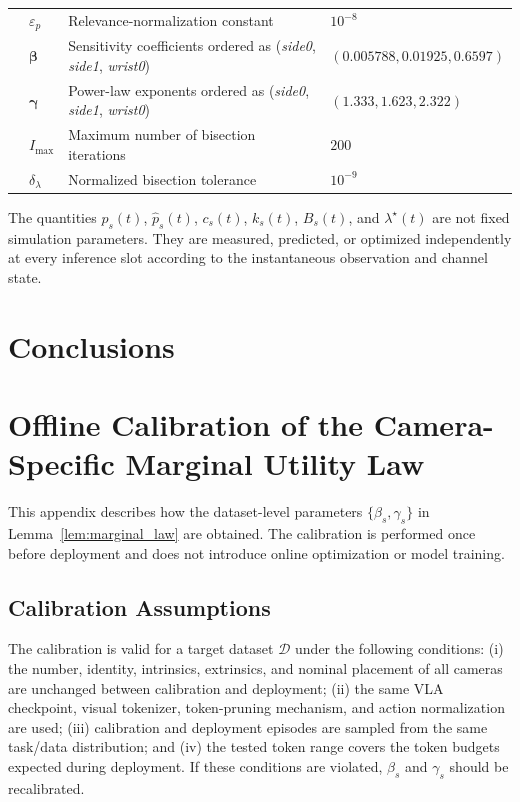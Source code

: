 \documentclass[lettersize,journal]{IEEEtran}
\theoremstyle{custom}
\begin{document}
\begin{table}[t]
\begin{tabular}{
    p{}
    p{}
    p{}
    p{}}
& $\varepsilon_p$
& Relevance-normalization constant
& $10^{-8}$ \\

& $\boldsymbol{\beta}$
& Sensitivity coefficients ordered as
(\emph{side0}, \emph{side1}, \emph{wrist0})
& $(0.005788,0.01925,0.6597)$ \\

& $\boldsymbol{\gamma}$
& Power-law exponents ordered as
(\emph{side0}, \emph{side1}, \emph{wrist0})
& $(1.333,1.623,2.322)$ \\

& $I_{\max}$
& Maximum number of bisection iterations
& $200$ \\

& $\delta_{\lambda}$
& Normalized bisection tolerance
& $10^{-9}$ \\

\bottomrule
\end{tabular}
\end{table}

The quantities $p_s(t)$, $\widehat p_s(t)$, $c_s(t)$, $k_s(t)$,
$B_s(t)$, and $\lambda^\star(t)$ are not fixed simulation parameters.
They are measured, predicted, or optimized independently at every
inference slot according to the instantaneous observation and channel
state.
 
\section{Conclusions}

\appendices
\section{Offline Calibration of the Camera-Specific Marginal Utility Law}\label{app:calibration}
This appendix describes how the dataset-level parameters $\{\beta_s,\gamma_s\}$ in Lemma~\ref{lem:marginal_law} are obtained. The calibration is performed once before deployment and does not introduce online optimization or model training.

\subsection{Calibration Assumptions}
The calibration is valid for a target dataset $\mathcal D$ under the following conditions: (i) the number, identity, intrinsics, extrinsics, and nominal placement of all cameras are unchanged between calibration and deployment; (ii) the same VLA checkpoint, visual tokenizer, token-pruning mechanism, and action normalization are used; (iii) calibration and deployment episodes are sampled from the same task/data distribution; and (iv) the tested token range covers the token budgets expected during deployment. If these conditions are violated, $\beta_s$ and $\gamma_s$ should be recalibrated.
\end{document}
